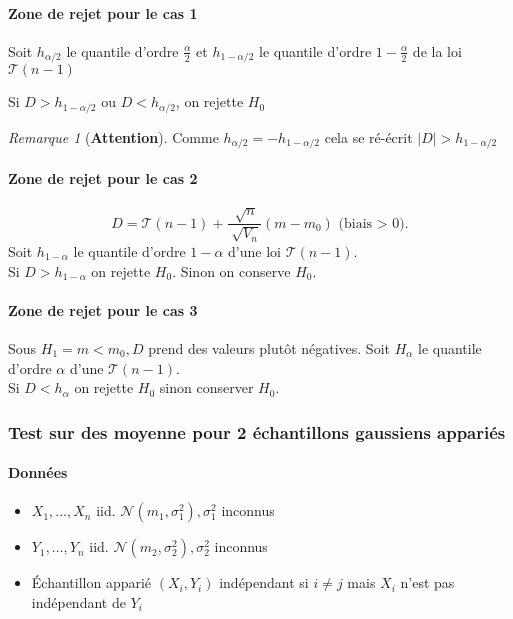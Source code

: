 \documentclass{article}
\theoremstyle{plain}%
\theoremstyle{definition}
\theoremstyle{remark}
\newtheorem*{rem}{Remarque}
\begin{document}
\paragraph*{Zone de rejet pour le cas 1}
Soit $ h_{\alpha /2} $ le quantile d'ordre $ \frac{\alpha }{2} $ et $ h_{1-\alpha /2} $ le quantile d'ordre $ 1 - \frac{\alpha }{2} $ de la loi $ \mathcal{T}(n-1) $ 

Si $ D > h_{1 - \alpha /2} $ ou $ D < h_{\alpha /2} $, on rejette $ H_0 $ 
\begin{rem}[\textbf{Attention}]
    Comme $ h_{\alpha /2} = - h_{1-\alpha /2} $ cela se ré-écrit $ \left| D \right| > h_{1 - \alpha /2} $ 
\end{rem}

\paragraph*{Zone de rejet pour le cas 2}
\[
    D = \mathcal{T}(n-1) + \frac{\sqrt[]{n}}{\sqrt[]{V_n}}(m-m_0) \text{ (biais > 0)}
.\]
Soit $ h_{1 - \alpha } $ le quantile d'ordre $ 1 - \alpha  $ d'une loi $ \mathcal{T}(n-1)$. \\
Si $ D > h_{1-\alpha } $ on rejette $ H_0 $. Sinon on conserve $ H_0 $. 

\paragraph*{Zone de rejet pour le cas 3}
Sous $ H_1 = m < m_0, D $ prend des valeurs plutôt négatives. Soit $ H_\alpha  $ le quantile d'ordre $ \alpha  $ d'une $ \mathcal{T}(n-1) $. \\
Si $ D < h_\alpha $ on rejette $ H_0 $ sinon conserver $ H_0 $. 

\subsubsection{Test sur des moyenne pour 2 échantillons gaussiens appariés}
\paragraph*{Données} \begin{itemize}
    \item $ X_1, \dots, X_n  $ iid. $ \mathcal{N}(m_1, \sigma_1 ^2), \sigma_1^2 $ inconnus
    \item $ Y_1, \dots, Y_n  $ iid. $ \mathcal{N}(m_2, \sigma_2 ^2), \sigma_2^2 $ inconnus
    \item Échantillon apparié $ (X_i, Y_i) $ indépendant si $ i \neq j $ mais $ X_i $ n'est pas indépendant de $ Y_i $ 
\end{itemize}
\end{document}
